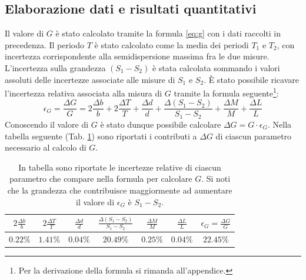 \documentclass{article}
\begin{document}
\subsection{Elaborazione dati e risultati quantitativi}
Il valore di $G$ è stato calcolato tramite la formula \eqref{eq:g} con i dati raccolti in precedenza. Il periodo $T$ è stato calcolato come la media dei periodi $T_1$ e $T_2$, con incertezza corrispondente alla semidispersione massima fra le due misure. L'incertezza sulla grandezza $(S_1 - S_2)$ è stata calcolata sommando i valori assoluti delle incertezze associate alle misure di $S_1$ e $S_2$.
È stato possibile ricavare l'incertezza relativa associata alla misura di $G$ tramite la formula seguente\footnote{Per la derivazione della formula si rimanda all'appendice.}:
\begin{equation}\label{eq:epsilon}
    \epsilon_G = \frac{\Delta G}{G} = 2 \frac{\Delta b}{b} + 2 \frac{\Delta T}{T} + \frac{\Delta d}{d} + \frac{\Delta \left( S_1 - S_2 \right)}{S_1 - S_2} + \frac{\Delta M}{M} + \frac{\Delta L}{L}
\end{equation}
Conoscendo il valore di $G$ è stato dunque possibile calcolare $\Delta G = G \cdot \epsilon_G$. Nella tabella seguente (Tab. \ref{tab:incertezze_relative}) sono riportati i contributi a $\Delta G$ di ciascun parametro necessario al calcolo di $G$.
\begin{table}[ht!]
    \centering
    \begin{tabular}{|c|c|c|c|c|c||c|}
        \hline
        $2 \frac{\Delta b}{b}$ & $2 \frac{\Delta T}{T}$ & $\frac{\Delta d}{d}$ & $\frac{\Delta \left(S_1 - S_2 \right)}{S_1 - S_2}$ & $\frac{\Delta M}{M}$ & $\frac{\Delta L}{L}$ & $\epsilon_G = \frac{\Delta G}{G}$ \\
        \hline
        $0.22\%$ & $1.41\%$ & $0.04\%$ & $20.49\%$ & $0.25\%$ & $0.04\%$ & $22.45\%$\\
        \hline
    \end{tabular}
    \caption{In tabella sono riportate le incertezze relative di ciascun parametro che compare nella formula per calcolare $G$. Si noti che la grandezza che contribuisce maggiormente ad aumentare il valore di $\epsilon_G$ è $S_1 - S_2$.}
    \label{tab:incertezze_relative}
\end{table}
\end{document}
